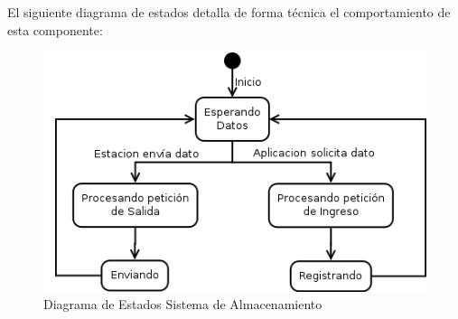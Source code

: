 \newpage
El siguiente diagrama de estados detalla de forma técnica el comportamiento de esta componente:
\begin{figure}[h!]
        \centering
        \includegraphics[scale=0.5]{images/datosEstados}
        \caption{Diagrama de Estados Sistema de Almacenamiento}
        \label{almacenamientoSecuencia}
\end{figure}

